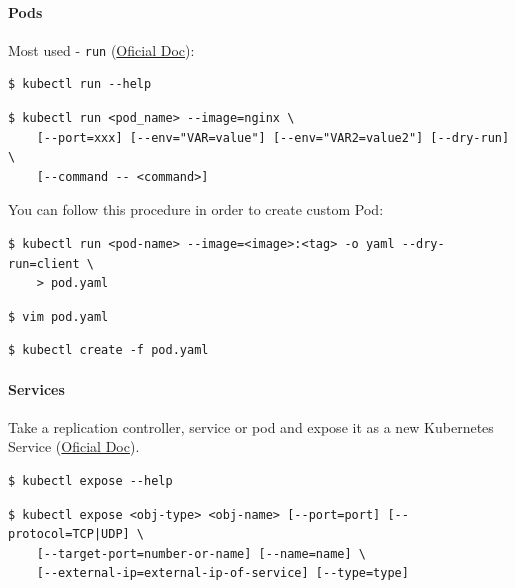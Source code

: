 \documentclass{article}
\newenvironment{blocktemplate}[1]{%
    \tcolorbox[beamer,%
    noparskip,breakable,
    colframe=Blue,%
    colbacklower=LimeGreen!75!LightGreen,%
    title=#1]}%
    {\endtcolorbox}
\newenvironment{codetemplate}[1][]{%
  \mybasecolorbox[#1]
  \itshape
}{%
  \endmybasecolorbox
}
\begin{document}
\paragraph{Pods}
Most used - \verb|run| (\href{https://jamesdefabia.github.io/docs/user-guide/kubectl/kubectl_run/}{Oficial Doc}):
\begin{codetemplate}{}
\begin{verbatim}
$ kubectl run --help
\end{verbatim}
\end{codetemplate}
\begin{codetemplate}
\begin{verbatim}
$ kubectl run <pod_name> --image=nginx \
    [--port=xxx] [--env="VAR=value"] [--env="VAR2=value2"] [--dry-run] \
    [--command -- <command>]
\end{verbatim}
\end{codetemplate}

\begin{blocktemplate}{NOTE}
You can follow this procedure in order to create custom Pod:
\begin{codetemplate}{}
\begin{verbatim}
$ kubectl run <pod-name> --image=<image>:<tag> -o yaml --dry-run=client \
    > pod.yaml
\end{verbatim}
\end{codetemplate}
\begin{codetemplate}{}
\begin{verbatim}
$ vim pod.yaml
\end{verbatim}
\end{codetemplate}
\begin{codetemplate}{}
\begin{verbatim}
$ kubectl create -f pod.yaml
\end{verbatim}
\end{codetemplate}
\end{blocktemplate}

\paragraph{Services}

Take a replication controller, service or pod and expose it as a new Kubernetes Service (\href{https://jamesdefabia.github.io/docs/user-guide/kubectl/kubectl_expose/}{Oficial Doc}).

\begin{codetemplate}{}
\begin{verbatim}
$ kubectl expose --help
\end{verbatim}
\end{codetemplate}
\begin{codetemplate}{}
\begin{verbatim}
$ kubectl expose <obj-type> <obj-name> [--port=port] [--protocol=TCP|UDP] \
    [--target-port=number-or-name] [--name=name] \
    [--external-ip=external-ip-of-service] [--type=type]
\end{verbatim}
\end{codetemplate}
\end{document}
